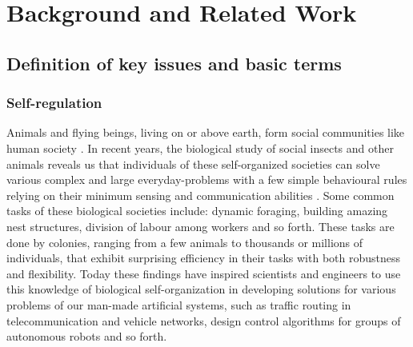 \chapter{Background and Related Work}
\label{bg}
\section{Definition of key issues and basic terms}
\subsection{Self-regulation}
Animals and flying beings, living on or above earth, form social communities like human society \cite{SIHQ1995}. In recent years, the biological study of social insects and other animals reveals 
us that individuals of these self-organized  societies can solve various complex and large everyday-problems with a few simple behavioural rules relying on their minimum sensing and communication abilities \cite{Garnier+2007,Camazine+2001}. Some common tasks of these biological societies include: dynamic foraging, building amazing nest structures, division of labour among workers and so forth. These tasks are done by colonies,  ranging from a few animals to thousands or millions of individuals, that exhibit surprising efficiency in their tasks with both robustness and flexibility. Today these findings have inspired scientists and engineers to use this knowledge of biological self-organization in developing solutions for various problems of our man-made artificial systems, such as traffic routing in telecommunication and vehicle networks, design control algorithms for groups of autonomous robots and so forth.

